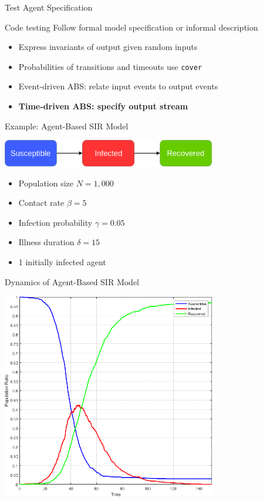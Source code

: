 \documentclass{beamer} %
\begin{document}
\begin{frame}{Test Agent Specification}
\begin{block}{Code testing}
Follow formal model specification or informal description
\end{block}

\begin{block}{}
  \begin{itemize}
  	\item Express invariants of output given random inputs
  	\item Probabilities of transitions and timeouts use \texttt{cover}
    \item Event-driven ABS: relate input events to output events 
    \item \textbf{Time-driven ABS: specify output stream}
  \end{itemize}
\end{block}
\end{frame}

\begin{frame}{Example: Agent-Based SIR Model}
\begin{center}
\includegraphics[width=0.7\textwidth]{./fig/SIR_transitions.png}
\end{center}
  \begin{itemize}
    \item Population size $N = 1,000$
 	\item Contact rate $\beta = 5$
 	\item Infection probability $\gamma = 0.05$
 	\item Illness duration $\delta = 15$
 	\item 1 initially infected agent
  \end{itemize}
\end{frame}

\begin{frame}{Dynamics of Agent-Based SIR Model}
\begin{center}
\includegraphics[width=0.7\textwidth]{./fig/SIR_Yampa_dt001.png}
\end{center}
\end{frame}
\end{document}
